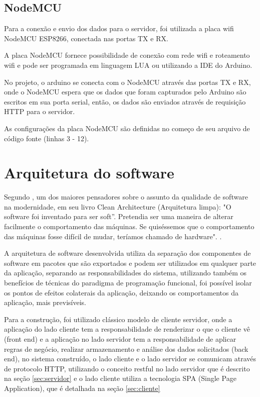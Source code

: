 \section{NodeMCU}
\label{sec:nodemcu}

Para a conexão e envio dos dados para o servidor, foi utilizada a placa wifi NodeMCU ESP8266, conectada nas portas TX e RX.

A placa NodeMCU fornece possibilidade de conexão com rede wifi e roteamento wifi e pode ser programada em linguagem LUA ou utilizando a IDE do Arduino.

No projeto, o arduino se conecta com o NodeMCU através das portas TX e RX, onde o NodeMCU espera que os dados que foram capturados pelo Arduino são escritos em sua porta serial, então, os dados são enviados através de requisição HTTP para o servidor.

As configurações da placa NodeMCU são definidas no começo de seu arquivo de código fonte (linhas 3 - 12).

\chapter{Arquitetura do software}
\label{sec:arquitetura_software}

Segundo , um dos maiores pensadores sobre o assunto da qualidade de software na modernidade, em seu livro Clean Architecture (Arquitetura limpa): "O software foi inventado para ser soft”. Pretendia ser uma maneira de alterar facilmente o comportamento das máquinas. Se quiséssemos que o comportamento das máquinas fosse difícil de mudar, teríamos chamado de hardware". \cite{clean_architecture}.

A arquitetura de software desenvolvida utiliza da separação dos componentes de software em pacotes que são exportados e podem ser utilizados em qualquer parte da aplicação, separando as responsabilidades do sistema, utilizando também os benefícios de técnicas do paradigma de programação funcional, foi possível isolar os pontos de efeitos colaterais da aplicação, deixando os comportamentos da aplicação, mais previsíveis.

Para a construção, foi utilizado clássico modelo de cliente servidor, onde a aplicação do lado cliente tem a responsabilidade de renderizar o que o cliente vê (front end) e a aplicação no lado servidor tem a responsabilidade de aplicar regras de negócio, realizar armazenamento e análise dos dados solicitados (back end), no sistema construído, o lado cliente e o lado servidor se comunicam através de protocolo HTTP, utilizando o conceito restful no lado servidor que é descrito na seção \ref{sec:servidor} e o lado cliente utiliza a tecnologia SPA (Single Page Application), que é detalhada na seção \ref{sec:cliente}

